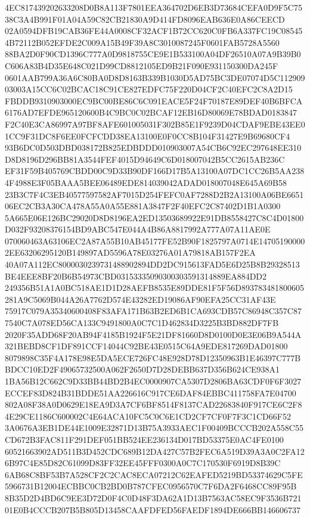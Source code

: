 \documentclass[UTF8,fontset=fandol,zihao=-4,a4paper]{ctexart}
\begin{document}
{{4EC817439202633208D0B8A113F7801EEA364702D6EB3D73684CEFA0D9F5C7538C3A4B991F01A04A59C82CB21830A9D414FD8096EAB636E0A86CEECD
02A0594DFB19CAB36FE44A0008CF32ACF1B72CC620C0FB6A337FC19C085454B72112B052EFDE2C009A15B49F39A8C3010087245F0601FAB5728A5560
88BA2D0F90CD1396C777A0D9818755CE9E1B533100A04DF26510A07A9B39B0C606A83B4D35E648C021D99CD8812105ED9B21F090E931150300DA245F
0601AAB799A36A6C80BA0D8D8163B339B1030D5AD75BC3DE07074D5C11290903003A15CC6C02BCAC18C91CE827EDFC75F220D04CF2C40EFC2C8A2D15
FBDDB9310903000EC9BC00BE86C6C091EACE5F24F70187E89DEF40B6BFCA6176AD7EFDE965120600B4C9BC0C02BCAF12EB16D80069E78BDAD0183847
F2C40E3CA86997A97BF8AFE601005031F302B85E1F9239D04CDAF9EBE43EE01CC9F31DC8F6EE0FCFCDD38EA13100E0F0CC8B104F31427E9B69680CF4
93B6DC0D503DBD038172B825EDBDDD010903007A54CB6C92EC297648EE310D8D8196D296BB81A3544FEF4015D94649C6D018007042B5CC2615AB236C
EF31F59B405769CBDD00C9D33B90DF166D17B5A13100A07DC1CC26B5AA2384F4988E3F05BAAA5BEE06489EDE814039042ADAD018007048E645A69B58
23B3C7F4C3EB40577597582AF7015D254FEFC0AF7288D2B2A13100A06BE665106EC2CB3A30CA478A55A0A55E881A3847F2F40EFC2C87402D1B1A0300
5A665E06E126BC29020D8D8196EA2ED13503689922E91DB8558427C8C4D01800D032F93208376154BD9ABC547E044A4B86A8817992A777A07A11AE0E
070060463A63106EC2A87A55B10AB45177FE52B90F1825797A0714E147051900002EE63206295120B149897AD5596A78E03276A01A79818AB157F2EA
40A07A112EC8000030239731488902894DD2DC915613FAD5E6D25B8B29328513BE4EEE8BF20B6B54973CBD03153335090300303591314889EA884DD2
249356B51A1A0BC518AE1D1D28AEFB8535E89DDE81F5F56D893783481800605281A9C5069B044A26A7762D574E43282ED19086AF90EFA25CC31AF43E
75917C079A35340600408F83AFA171B63B2ED6B1CA693CDB57C86948C357C877540C7A078ED56CA133C9491800A0C7C1D462834D3225B3BD882DF7FB
2020F35ADD68F20AB94F4185B1924F5E21DF81660D8D0100D0E3E06B9A544A321BEBD8CF1DF891CCF14044C92BE43E0515C64A9EDE817269DAD01800
8079898C35F4A178E98E5DA5ECE726FC48E928D78D12350963B1E46397C777BBDCC10ED2F49065732500A062F2650D7D28DEBB637D356B624CE938A1
1BA56B12C662C9D33BB44BD2B4EC0000907CA5307D2806BA63CDF0F6F3027ECCEF83D824B31BDDE51AA226616C917CE6DAF84EBBC411758FA7E04700
802A08F38A0D0629E18EA9D3A7CF6BF8514F8137CAD22683840F917CE6C2F84E29CE1186C600002C4E64ACA10FC5C0C6E1CD2CF7CF0F7F3C1CD66F52
3A0676A3EB1DE44E1009E32871D13B75A3933AEC1F00409BCCCB202A558C55CD672B3FAC811F291DEF051BB524EE236134D017BD53375E0AC4FE0100
60521663902AD511B3D452CDC689B12DA427C57B2FEC6A519D39A3A0C2FA126B97C4E85D82C61099D83FF32EE45FFF0300A0C7C170530F6919D8B39C
6AB68C8BF53B7A528CF2C2CAC8ECA07212C62EAFED5219BD53374629C5FE5966731B12004ECBBC0CB2BD0B787CFEC0956570C7F6DA2F6468CC89F95B
8B35D2D4BD6C9EE3D72D0F4C0D48F3DA62A1D13B7563AC58EC9F3536B72101E0B4CCCB207B5B805D13458CAAFDFED56FAEDF1894DE666BB146606737
}}
\end{document}
